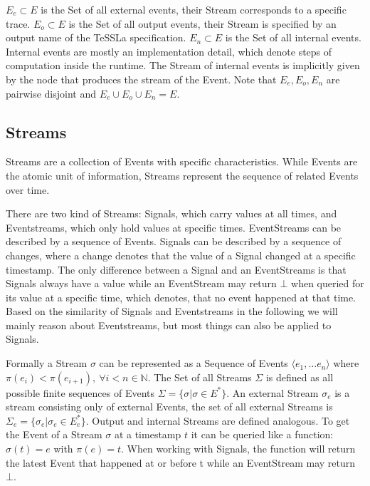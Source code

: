 \(E_e \subset E\) is the Set of all external events, their Stream corresponds to a specific trace.
\(E_o \subset E\) is the Set of all output events, their Stream is specified by an output name of the TeSSLa specification.
\(E_n \subset E\) is the Set of all internal events.
Internal events are mostly an implementation detail, which denote steps of computation inside the runtime.
The Stream of internal events is implicitly given by the node that produces the stream of the Event.
Note that \(E_e, E_o, E_n\) are pairwise disjoint and \(E_e \cup E_o \cup E_n = E\).

\subsection{Streams}
\label{sec:concepts:defs:streams}

Streams are a collection of Events with specific characteristics.
While Events are the atomic unit of information, Streams represent the sequence of related Events over time.

There are two kind of Streams: Signals, which carry values at all times, and Event\-streams, which only hold values at specific times.
EventStreams can be described by a sequence of Events.
Signals can be described by a sequence of changes, where a change denotes that the value of a Signal changed at a specific timestamp.
The only difference between a Signal and an EventStreams is that Signals always have a value while an EventStream may return \(\bot\) when queried for its value at a specific time, which denotes, that no event happened at that time.
Based on the similarity of Signals and Eventstreams in the following we will mainly reason about Eventstreams, but most things can also be applied to Signals.

Formally a Stream \(\sigma\) can be represented as a Sequence of Events \(\langle e_1, \dots e_n\rangle\) where \(\pi(e_i) < \pi(e_{i+1}),\ \forall i < n \in \mathbb{N}\).
The Set of all Streams \(\Sigma\) is defined as all possible finite sequences of Events \(\Sigma = \{\sigma | \sigma \in E^* \}\).
An external Stream \(\sigma_e\) is a stream consisting only of external Events, the set of all external Streams is \(\Sigma_e = \{\sigma_e | \sigma_e \in E_e^*\}\).
Output and internal Streams are defined analogous.
To get the Event of a Stream \(\sigma\) at a timestamp \(t\) it can be queried like a function: \(\sigma(t) = e\) with \(\pi(e) = t \).
When working with Signals, the function will return the latest Event that happened at or before t while an EventStream may return \(\bot\).

